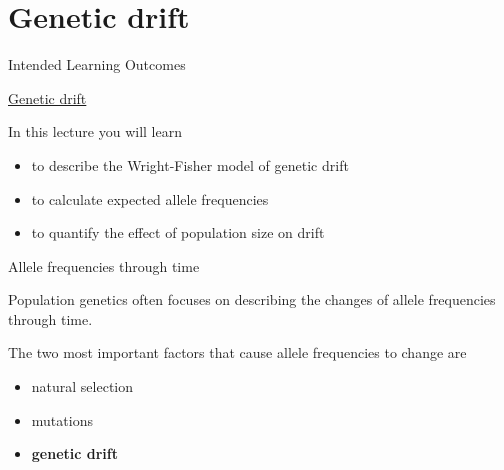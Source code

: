 
\section{Genetic drift}

\begin{frame}{Intended Learning Outcomes}

	\underline{Genetic drift}

	\bigskip

	In this lecture you will learn
	\begin{itemize}
		\item to describe the Wright-Fisher model of genetic drift
		\item to calculate expected allele frequencies
		\item to quantify the effect of population size on drift
	\end{itemize}

\end{frame}

\begin{frame}{Allele frequencies through time}

	Population genetics often focuses on describing the changes of allele frequencies through time.

	\bigskip
	The two most important factors that cause allele frequencies to change are
	\begin{itemize}
		\item natural selection
		\item mutations
		\item \textbf{genetic drift}
	\end{itemize}

\end{frame}


